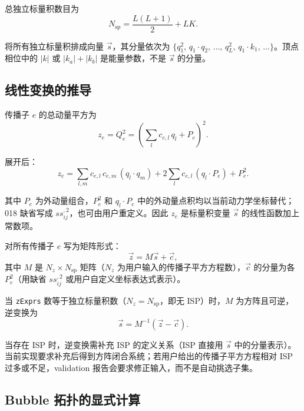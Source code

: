 ﻿\documentclass[a4paper,11pt]{article}
\begin{document}
总独立标量积数目为
\begin{equation}
  N_{\text{sp}} = \frac{L(L+1)}{2} + LK.
  \label{Nsp}
\end{equation}

将所有独立标量积排成向量 $\vec{s}$，其分量依次为 $\{q_1^2,\, q_1 \cdot q_2,\, \ldots,\, q_L^2,\, q_1 \cdot k_1,\, \ldots\}$。顶点相位中的 $|k|$ 或 $|k_a|+|k_b|$ 是能量参数，不是 $\vec{s}$ 的分量。

\subsection{线性变换的推导}

传播子 $e$ 的总动量平方为
\begin{equation}
  z_e = Q_e^2 = \left(\sum_l c_{e,l}\, q_l + P_e\right)^2.
  \label{zeExpand}
\end{equation}

展开后：
\begin{equation}
  z_e = \sum_{l,m} c_{e,l}\, c_{e,m}\, (q_l \cdot q_m) + 2 \sum_l c_{e,l}\, (q_l \cdot P_e) + P_e^2.
  \label{zeExpandFull}
\end{equation}

其中 $P_e$ 为外动量组合，$P_e^2$ 和 $q_l \cdot P_e$ 中的外动量点积均以当前动力学坐标替代；018 缺省写成 $ss_{ij}^{,2}$，也可由用户重定义。因此 $z_e$ 是标量积变量 $\vec{s}$ 的线性函数加上常数项。

对所有传播子 $e$ 写为矩阵形式：
\begin{equation}
  \vec{z} = M \vec{s} + \vec{c},
  \label{zLinear}
\end{equation}
其中 $M$ 是 $N_z \times N_{\text{sp}}$ 矩阵（$N_z$ 为用户输入的传播子平方方程数），$\vec{c}$ 的分量为各 $P_e^2$（用缺省 $ss_{ij}^{,2}$ 或用户自定义坐标表达式表示）。

当 \texttt{zExprs} 数等于独立标量积数（$N_z = N_{\text{sp}}$，即无 ISP）时，$M$ 为方阵且可逆，逆变换为
\begin{equation}
  \vec{s} = M^{-1}(\vec{z} - \vec{c}).
  \label{zInverse}
\end{equation}

当存在 ISP 时，逆变换需补充 ISP 的定义关系（ISP 直接用 $\vec{s}$ 中的分量表示）。当前实现要求补充后得到方阵闭合系统；若用户给出的传播子平方方程相对 ISP 过多或不足，validation 报告会要求修正输入，而不是自动挑选子集。

\subsection{Bubble 拓扑的显式计算}
\end{document}

